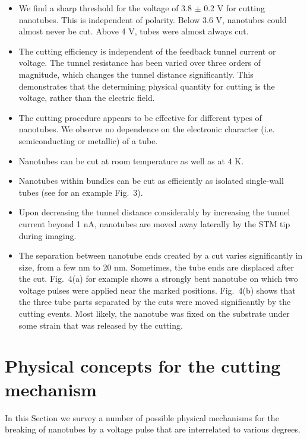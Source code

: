\begin{multicols}{2}
\begin{itemize}
\item  We find a sharp threshold for the voltage of 3.8 $\pm $ 0.2 V for cutting
nanotubes. This is independent of polarity. Below 3.6 V, nanotubes
could almost never be cut. Above 4 V, tubes were almost always
cut.

\item  The cutting efficiency is independent of the feedback tunnel current
or voltage. The tunnel resistance has been varied over three
orders of magnitude, which changes the tunnel distance
significantly. This demonstrates that the determining physical
quantity for cutting is the voltage, rather than the electric
field.

\item  The cutting procedure appears to be effective for different types
of nanotubes. We observe no dependence on the electronic character
(i.e. semiconducting or metallic) of a tube.

\item  Nanotubes can be cut at room temperature as well as at 4 K.

\item  Nanotubes within bundles can be cut as efficiently as isolated
single-wall tubes (see for an example Fig.~3).

\item Upon decreasing the tunnel distance considerably by increasing the tunnel
current beyond 1 nA, nanotubes are moved away laterally by the STM
tip during imaging.

\item  The separation between nanotube ends created by a cut varies
significantly in size, from a few nm to 20 nm. Sometimes, the tube
ends are displaced after the cut. Fig.~4(a) for example shows a
strongly bent nanotube on which two voltage pulses were applied
near the marked positions. Fig.~4(b) shows that the three tube
parts separated by the cuts were moved significantly by the
cutting events. Most likely, the nanotube was fixed on the
substrate under some strain that was released by the cutting.
\end{itemize}



\section{Physical concepts for the cutting mechanism}

In this Section we survey a number of possible physical mechanisms
for the breaking of nanotubes by a voltage pulse that are
interrelated to various degrees\cite{comment_binding}.


\end{multicols}

